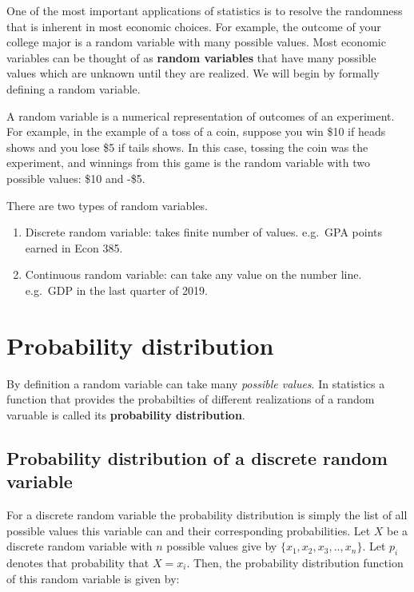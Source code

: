 \documentclass[]{book}
\theoremstyle{definition}
\theoremstyle{definition}
\theoremstyle{definition}
\theoremstyle{remark}
\let\BeginKnitrBlock\begin \let\EndKnitrBlock\end
\begin{document}
One of the most important applications of statistics is to resolve the randomness that is inherent in most economic choices. For example, the outcome of your college major is a random variable with many possible values. Most economic variables can be thought of as \textbf{random variables} that have many possible values which are unknown until they are realized. We will begin by formally defining a random variable.

\BeginKnitrBlock{definition}[Random Variable]
\protect\hypertarget{def:unnamed-chunk-37}{}{\label{def:unnamed-chunk-37} {} }A random variable is a numerical representation of outcomes of an experiment. For example, in the example of a toss of a coin, suppose you win \$10 if heads shows and you lose \$5 if tails shows. In this case, tossing the coin was the experiment, and winnings from this game is the random variable with two possible values: \$10 and -\$5.
\EndKnitrBlock{definition}

There are two types of random variables.

\begin{enumerate}
\def\labelenumi{\arabic{enumi}.}
\item
  Discrete random variable: takes finite number of values. e.g.~GPA points earned in Econ 385.
\item
  Continuous random variable: can take any value on the number line. e.g.~GDP in the last quarter of 2019.
\end{enumerate}

\hypertarget{probability-distribution}{%
\section{Probability distribution}\label{probability-distribution}}

By definition a random variable can take many \emph{possible values}. In statistics a function that provides the probabilties of different realizations of a random varuable is called its \textbf{probability distribution}.

\hypertarget{probability-distribution-of-a-discrete-random-variable}{%
\subsection{Probability distribution of a discrete random variable}\label{probability-distribution-of-a-discrete-random-variable}}

For a discrete random variable the probability distribution is simply the list of all possible values this variable can and their corresponding probabilities. Let \(X\) be a discrete random variable with \(n\) possible values give by \(\{x_1,x_2,x_3,..,x_n\}\). Let \(p_i\) denotes that probability that \(X=x_i\). Then, the probability distribution function of this random variable is given by:
\end{document}
